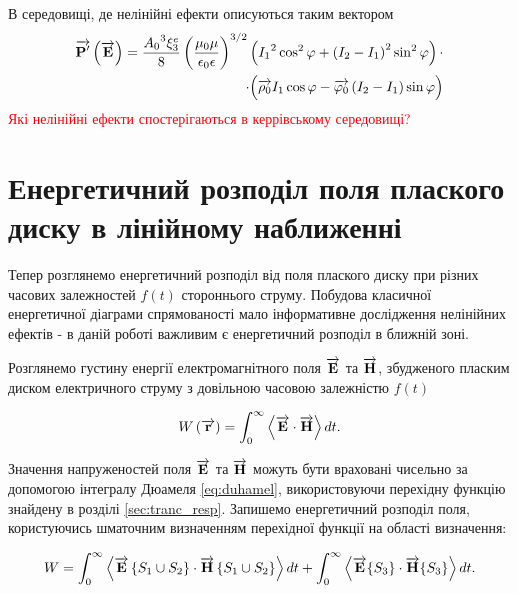 %
В середовищі, де нелінійні ефекти описуються таким вектором
%
\textcolor{lightgray}{ \begin{equation*} \begin{aligned}
\overrightarrow{\mathbf P^\prime} \left( \overrightarrow{\mathbf E} \right) = 
\frac{ {A_0}^3 \xi_3^e }{ 8 } \left( \frac{\mu_0 \mu}
{\epsilon_0 \epsilon} \right)^{3/2} \left( {I_1}^2 \cos^2 \varphi + 
\left( I_2 - I_1 \right)^2 \sin^2 \varphi \right) \cdot \\ 
\cdot \Big( \overrightarrow{\mathbf \rho_0} I_1 \cos \varphi - 
\overrightarrow{\mathbf  \varphi_0 } \left( I_2 - I_1 \right) \sin \varphi \Big)
\end{aligned} \end{equation*} }
%
\textcolor{red}{ Які нелінійні ефекти спостерігаються в керрівському середовищі?}

\section{Енергетичний розподіл поля плаского диску в лінійному наближенні}

Тепер розглянемо енергетичний розподіл від поля плаского диску при різних
часових залежностей $ f(t) $ стороннього струму. Побудова класичної 
енергетичної діаграми спрямованості мало інформативне дослідження нелінійних
ефектів - в даній роботі важливим є енергетичний розподіл в ближній зоні.

Розглянемо густину енергії електромагнітного поля $ \overrightarrow{\mathbf E} $ та 
$ \overrightarrow{\mathbf H} $, збудженого пласким диском електричного струму з довільною 
часовою залежністю $ f(t) $

\begin{equation}
W \left( \overrightarrow{\mathbf r} \right) = \int_0^\infty \left< \overrightarrow{\mathbf E} \cdot \overrightarrow{\mathbf H} \right> dt.
\end{equation}

Значення напруженостей поля $ \overrightarrow{\mathbf E} $ та $ \overrightarrow{\mathbf H} $ можуть бути 
враховані чисельно за допомогою інтегралу Дюамеля \eqref{eq:duhamel},
використовуючи перехідну функцію знайдену в розділі \ref{sec:tranc_resp}.
Запишемо енергетичний розподіл поля, користуючись шматочним визначенням 
перехідної функції на області визначення:

\begin{equation}
W = \int_0^\infty 
\left< \overrightarrow{\mathbf E}\left\{S_1 \cup S_2\right\} \cdot \overrightarrow{\mathbf H}\left\{S_1 \cup S_2 \right\} \right> dt + 
\int_0^\infty \left< \overrightarrow{\mathbf E}\{S_3\} \cdot \overrightarrow{\mathbf H}\{S_3\} \right> dt.
\end{equation}


